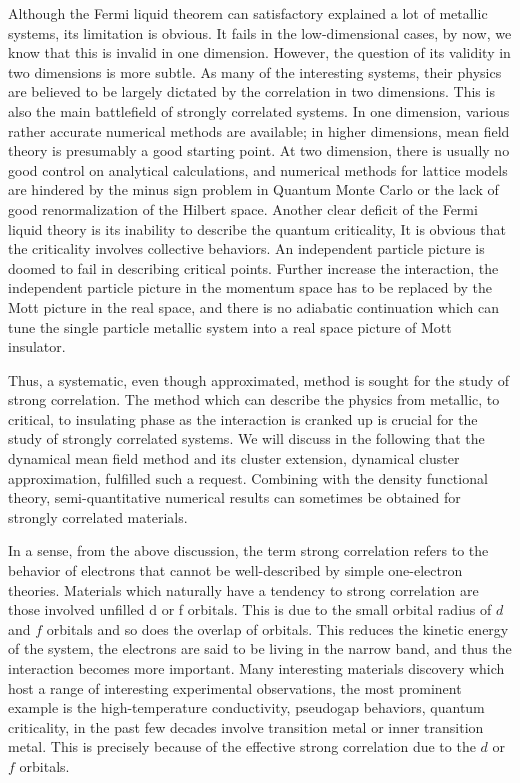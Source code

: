 Although the Fermi liquid theorem can satisfactory explained a lot of metallic
systems, its limitation is obvious. It fails in the low-dimensional
cases, by now, we know that this is invalid in one dimension. However, the question 
of its validity in two dimensions is more subtle. As many of the interesting systems, their
physics are believed to be largely dictated by the correlation in two dimensions.
This is also the main battlefield of strongly correlated systems. In one dimension, 
various rather accurate numerical methods are available; in higher dimensions, 
mean field theory is presumably a good starting point. At two dimension, there is 
usually no good control on analytical calculations, and numerical methods for lattice
models are hindered by the minus sign problem in Quantum Monte Carlo or the lack
of good renormalization of the Hilbert space. Another clear deficit of the Fermi liquid 
theory is its inability to describe the quantum criticality, It is obvious that the 
criticality involves collective behaviors. An independent particle picture is 
doomed to fail in describing critical points. Further increase the interaction, 
the independent particle picture in the momentum space has to be replaced by the Mott 
picture in the real space, and there is no adiabatic continuation which can tune
the single particle metallic system into a real space picture of Mott insulator.

Thus, a systematic, even though approximated, method is sought for the study of strong correlation. 
The method which can describe the physics from metallic, to critical, to insulating phase as 
the interaction is cranked up is crucial for the study of strongly correlated systems. 
We will discuss in the following that the dynamical mean field method and its cluster extension, 
dynamical cluster approximation, fulfilled such a request. Combining with the density functional theory,
semi-quantitative numerical results can sometimes be obtained for strongly correlated materials. 


In a sense, from the above discussion, the term strong correlation refers to the behavior of electrons
that cannot be well-described by simple one-electron theories. Materials
which naturally have a tendency to strong correlation are those involved
unfilled d or f orbitals. This is due to the small orbital radius of
$d$ and $f$ orbitals and so does the overlap of orbitals.
This reduces the kinetic energy of the system, the electrons are said to be living 
in the narrow band, and thus the interaction becomes more important. Many interesting materials discovery which host
a range of interesting experimental observations, the most prominent example is the
high-temperature conductivity, pseudogap behaviors, quantum
criticality, in the past few decades involve transition
metal or inner transition metal. This is precisely because of the effective
strong correlation due to the $d$ or $f$ orbitals.


